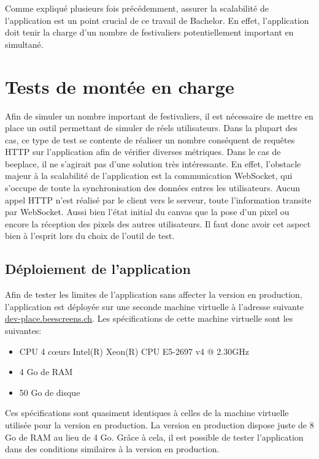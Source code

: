 Comme expliqué plusieurs fois précédemment, assurer la scalabilité de l'application est un point crucial de ce travail de Bachelor. En effet, l'application doit tenir la charge d'un nombre de festivaliers potentiellement important en simultané.

\section{Tests de montée en charge}

Afin de simuler un nombre important de festivaliers, il est nécessaire de mettre en place un outil permettant de simuler de réels utilisateurs. Dans la plupart des cas, ce type de test se contente de réaliser un nombre conséquent de requêtes HTTP sur l'application afin de vérifier diverses métriques. Dans le cas de \gls{beeplace}, il ne s'agirait pas d'une solution très intéressante. En effet, l'obstacle majeur à la scalabilité de l'application est la communication WebSocket, qui s'occupe de toute la synchronisation des données entres les utilisateurs. Aucun appel HTTP n'est réalisé par le client vers le serveur, toute l'information transite par WebSocket. Aussi bien l'état initial du canvas que la pose d'un pixel ou encore la réception des pixels des autres utilisateurs. Il faut donc avoir cet aspect bien à l'esprit lors du choix de l'outil de test.

\subsection{Déploiement de l'application}

Afin de tester les limites de l'application sans affecter la version en production, l'application est déployée sur une seconde machine virtuelle à l'adresse suivante \href{https://dev-place.beescreens.ch}{dev-place.beescreens.ch}. Les spécifications de cette machine virtuelle sont les suivantes:

\begin{itemize}
  \item CPU 4 c\oe{}urs Intel(R) Xeon(R) CPU E5-2697 v4 @ 2.30GHz
  \item 4 Go de RAM
  \item 50 Go de disque
\end{itemize}

Ces spécifications sont quasiment identiques à celles de la machine virtuelle utilisée pour la version en production. La version en production dispose juste de 8 Go de RAM au lieu de 4 Go. Grâce à cela, il est possible de tester l'application dans des conditions similaires à la version en production.

